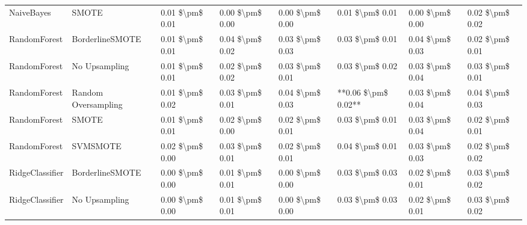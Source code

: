 \begin{tabular}{llllllll}
                     NaiveBayes &                         SMOTE & 0.01 \$\textbackslash pm\$ 0.01 &           0.00 \$\textbackslash pm\$ 0.00 &       0.00 \$\textbackslash pm\$ 0.00 &        0.01 \$\textbackslash pm\$ 0.01 &                         0.00 \$\textbackslash pm\$ 0.00 & 0.02 \$\textbackslash pm\$ 0.02 \\
                   RandomForest &               BorderlineSMOTE & 0.01 \$\textbackslash pm\$ 0.01 &           0.04 \$\textbackslash pm\$ 0.02 &       0.03 \$\textbackslash pm\$ 0.03 &        0.03 \$\textbackslash pm\$ 0.01 &                         0.04 \$\textbackslash pm\$ 0.03 & 0.02 \$\textbackslash pm\$ 0.01 \\
                   RandomForest &                 No Upsampling & 0.01 \$\textbackslash pm\$ 0.01 &           0.02 \$\textbackslash pm\$ 0.02 &       0.03 \$\textbackslash pm\$ 0.01 &        0.03 \$\textbackslash pm\$ 0.02 &                         0.03 \$\textbackslash pm\$ 0.04 & 0.03 \$\textbackslash pm\$ 0.01 \\
                   RandomForest &           Random Oversampling & 0.01 \$\textbackslash pm\$ 0.02 &           0.03 \$\textbackslash pm\$ 0.01 &       0.04 \$\textbackslash pm\$ 0.03 &    **0.06 \$\textbackslash pm\$ 0.02** &                         0.03 \$\textbackslash pm\$ 0.04 & 0.04 \$\textbackslash pm\$ 0.03 \\
                   RandomForest &                         SMOTE & 0.01 \$\textbackslash pm\$ 0.01 &           0.02 \$\textbackslash pm\$ 0.00 &       0.02 \$\textbackslash pm\$ 0.01 &        0.03 \$\textbackslash pm\$ 0.01 &                         0.03 \$\textbackslash pm\$ 0.04 & 0.02 \$\textbackslash pm\$ 0.01 \\
                   RandomForest &                      SVMSMOTE & 0.02 \$\textbackslash pm\$ 0.00 &           0.03 \$\textbackslash pm\$ 0.01 &       0.02 \$\textbackslash pm\$ 0.01 &        0.04 \$\textbackslash pm\$ 0.01 &                         0.03 \$\textbackslash pm\$ 0.03 & 0.02 \$\textbackslash pm\$ 0.02 \\
                RidgeClassifier &               BorderlineSMOTE & 0.00 \$\textbackslash pm\$ 0.00 &           0.01 \$\textbackslash pm\$ 0.01 &       0.00 \$\textbackslash pm\$ 0.00 &        0.03 \$\textbackslash pm\$ 0.03 &                         0.02 \$\textbackslash pm\$ 0.01 & 0.03 \$\textbackslash pm\$ 0.02 \\
                RidgeClassifier &                 No Upsampling & 0.00 \$\textbackslash pm\$ 0.00 &           0.01 \$\textbackslash pm\$ 0.01 &       0.00 \$\textbackslash pm\$ 0.00 &        0.03 \$\textbackslash pm\$ 0.03 &                         0.02 \$\textbackslash pm\$ 0.01 & 0.03 \$\textbackslash pm\$ 0.02 \\

\end{tabular}
